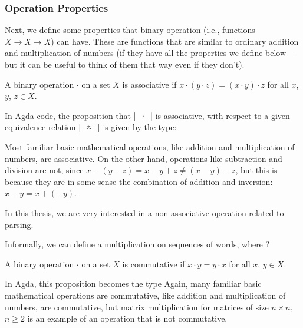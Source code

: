 \subsubsection{Operation Properties}
Next, we define some properties that binary operation (i.e., functions $X \to X \to X$) can have. These are functions that are similar to ordinary addition and multiplication of numbers (if they have all the properties we define below---but it can be useful to think of them that way even if they don't).
\begin{Definition} %
A binary operation $\cdot$ on a set $X$ is associative if $x \cdot (y \cdot z) = (x \cdot y) \cdot z$ for all $x$, $y$, $z \in X$.
\end{Definition}
In Agda code, the proposition that |_∙_| is associative, with respect to a given equivalence relation |_≈_| is given by the type:

Most familiar basic mathematical operations, like addition and multiplication of numbers, are associative. On the other hand, operations like subtraction and division are not, since $x - (y - z) = x - y + z \ne (x - y) - z$, but this is because they are in some sense the combination of addition and inversion: $x - y = x + (-y)$. %

In this thesis, we are very interested in a non-associative operation related to parsing.
\begin{Example}
Informally, we can define a multiplication on sequences of words, where ? 
\end{Example}
\begin{Definition} %
A binary operation $\cdot$ on a set $X$ is commutative if $x \cdot y = y \cdot x$ for all $x$, $y \in X$.
\end{Definition}
In Agda, this proposition becomes the type
Again, many familiar basic mathematical operations are commutative, like addition and multiplication of numbers, are commutative, but matrix multiplication for matrices of size $n \times n$, $n \ge 2$ is an example of an operation that is not commutative.

